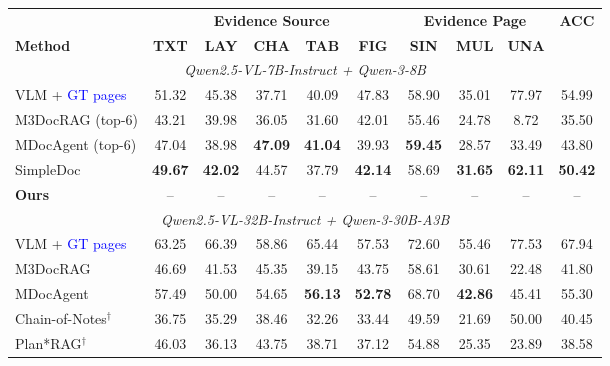 \begin{table}[h]
\centering
\small
\setlength{\tabcolsep}{5.5pt}
\renewcommand{\arraystretch}{1.08}
\begin{tabular}{lccccc|ccc|c}
\toprule
& \multicolumn{5}{c}{\textbf{Evidence Source}} 
& \multicolumn{3}{c}{\textbf{Evidence Page}} 
& \textbf{ACC} \\
\cmidrule(lr){2-6}\cmidrule(lr){7-9}
\textbf{Method} 
& \textbf{TXT} & \textbf{LAY} & \textbf{CHA} & \textbf{TAB} & \textbf{FIG}
& \textbf{SIN} & \textbf{MUL} & \textbf{UNA}
& \\
\midrule

\multicolumn{10}{c}{\textit{Qwen2.5-VL-7B-Instruct + Qwen-3-8B}} \\
\midrule
VLM + \textcolor{blue}{GT pages}
& 51.32 & 45.38 & 37.71 & 40.09 & 47.83
& 58.90 & 35.01 & 77.97 & 54.99 \\

M3DocRAG (top-6)
& 43.21 & 39.98 & 36.05 & 31.60 & 42.01
& 55.46 & 24.78 & 8.72 & 35.50 \\

MDocAgent (top-6)
& 47.04 & 38.98 & \textbf{47.09} & \textbf{41.04} & 39.93
& \textbf{59.45} & 28.57 & 33.49 & 43.80 \\

SimpleDoc
& \textbf{49.67} & \textbf{42.02} & 44.57 & 37.79 & \textbf{42.14}
& 58.69 & \textbf{31.65} & \textbf{62.11} & \textbf{50.42} \\

\textbf{Ours}
& -- & -- & -- & -- & --
& -- & -- & -- & -- \\

\midrule
\multicolumn{10}{c}{\textit{Qwen2.5-VL-32B-Instruct + Qwen-3-30B-A3B}} \\
\midrule

VLM + \textcolor{blue}{GT pages}
& 63.25 & 66.39 & 58.86 & 65.44 & 57.53
& 72.60 & 55.46 & 77.53 & 67.94 \\

M3DocRAG
& 46.69 & 41.53 & 45.35 & 39.15 & 43.75
& 58.61 & 30.61 & 22.48 & 41.80 \\

MDocAgent
& 57.49 & 50.00 & 54.65 & \textbf{56.13} & \textbf{52.78}
& 68.70 & \textbf{42.86} & 45.41 & 55.30 \\

Chain-of-Notes$^{\dagger}$
& 36.75 & 35.29 & 38.46 & 32.26 & 33.44
& 49.59 & 21.69 & 50.00 & 40.45 \\

Plan*RAG$^{\dagger}$
& 46.03 & 36.13 & 43.75 & 38.71 & 37.12
& 54.88 & 25.35 & 23.89 & 38.58 \\


\end{tabular}
\end{table}
